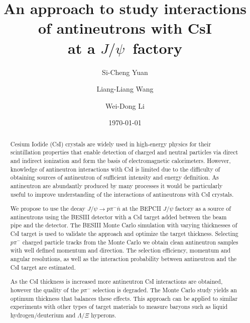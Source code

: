 \documentclass[aps,preprint,showkeys,superscriptaddress]{revtex4}
\newcommand{\jpsi}{$J/\psi$}
\begin{document}
\title{\boldmath An approach to study interactions of antineutrons with CsI \\
at a \jpsi~factory}
\author{Si-Cheng Yuan} 
\author{Liang-Liang Wang} 
\author{Wei-Dong Li} 


\date{\today}

\begin{abstract}

Cesium Iodide (CsI) crystals are widely used in high-energy physics 
for their scintillation properties that enable detection of charged and neutral 
particles via direct and indirect ionization and form the basis of electromagnetic
calorimeters. However, knowledge of antineutron interactions with CsI 
is limited due to the difficulty of obtaining sources of antineutron
of sufficient intensity and energy definition. 
As antineutron are abundantly produced by many processes it would be 
particularly useful to improve understanding of the interactions of antineutrons
with CsI crystals. 

We propose to use the decay $J/\psi\to p\pi^-\bar{n}$ at the BEPCII $J/\psi$ factory
as a source of antineutrons using the BESIII detector with a CsI target added between 
the beam pipe and the detector. The BESIII Monte Carlo simulation with varying thicknesses of CsI target 
is used to validate the approach and optimize the target thickness. 
Selecting $p\pi^-$ charged particle tracks from the Monte Carlo we obtain clean antineutron samples 
with well defined momentum and direction. 
The selection efficiency, momentum and angular resolutions, as well as the interaction probability 
between antineutron and the CsI target are estimated. 

As the CsI thickness is increased more antineutron CsI interactions are obtained,
however the quality of the $p\pi^-$ selection is degraded. The Monte Carlo study yields
an optimum thickness that balances these effects. 
This approach can be applied to similar experiments with other types of target materials to measure baryons 
such as liquid hydrogen/deuterium and $\Lambda/\Xi$ hyperons.
\end{abstract}

\end{document}
